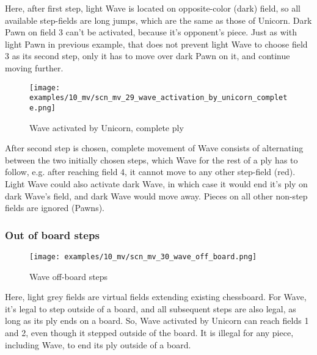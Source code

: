 Here, after first step, light Wave is located on opposite-color (dark) field, so all available
step-fields are long jumps, which are the same as those of Unicorn. Dark Pawn on field 3 can't be
activated, because it's opponent's piece. Just as with light Pawn in previous example, that does
not prevent light Wave to choose field 3 as its second step, only it has to move over dark Pawn
on it, and continue moving further.

\clearpage %

\vspace*{-2.1\baselineskip}
\noindent
\begin{figure}[!h]
\texttt{[image: examples/10\_mv/scn\_mv\_29\_wave\_activation\_by\_unicorn\_complete.png]}
\caption{Wave activated by Unicorn, complete ply}
\label{fig:scn_mv_29_wave_activation_by_unicorn_complete}
\end{figure}

After second step is chosen, complete movement of Wave consists of alternating between the two initially
chosen steps, which Wave for the rest of a ply has to follow, e.g. after reaching field 4, it cannot move
to any other step-field (red). Light Wave could also activate dark Wave, in which case it would end it's
ply on dark Wave's field, and dark Wave would move away. Pieces on all other non-step fields are ignored
(Pawns).

\clearpage %

\subsubsection*{Out of board steps}
\label{sec:Miranda's veil/Wave/Movement/Out of board steps}

\vspace*{-1.4\baselineskip}
\noindent
\begin{figure}[!h]
\texttt{[image: examples/10\_mv/scn\_mv\_30\_wave\_off\_board.png]}
\caption{Wave off-board steps}
\label{fig:scn_mv_30_wave_off_board}
\end{figure}

Here, light grey fields are virtual fields extending existing chessboard.
For Wave, it's legal to step outside of a board, and all subsequent steps
are also legal, as long as its ply ends on a board. So, Wave activated by
Unicorn can reach fields 1 and 2, even though it stepped outside of the
board. It is illegal for any piece, including Wave, to end its ply outside
of a board.

